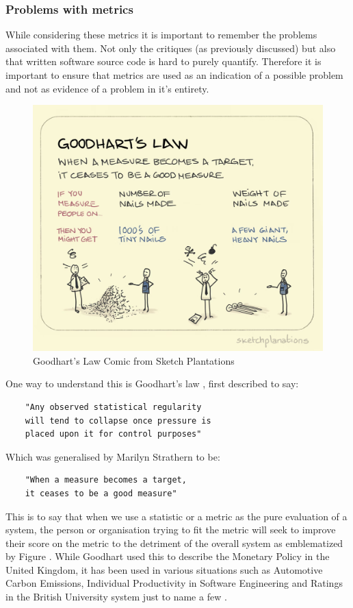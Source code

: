 \subsubsection{\textbf{Problems with metrics}}
While considering these metrics it is important to remember the problems associated with them. Not only the critiques (as previously discussed) 
but also that written software source code is hard to purely quantify. 
Therefore it is important to ensure that metrics are used as an indication of a possible problem and not as evidence of a 
problem in it's entirety.
\newline
\begin{figure}[h]
    \includegraphics[width=.4\textwidth]{images/goodhart.png}
    \caption{Goodhart's Law Comic from Sketch Plantations \cite{sketchplanations}}
    \label{fig:goodhart}
\end{figure}
One way to understand this is Goodhart's law \cite{Goodhart1984}, first described to say:
\begin{verbatim}
    "Any observed statistical regularity 
    will tend to collapse once pressure is 
    placed upon it for control purposes"
\end{verbatim}
\cite{Goodhart1984}
Which was generalised by Marilyn Strathern to be:
\begin{verbatim}
    "When a measure becomes a target, 
    it ceases to be a good measure"
\end{verbatim}
\cite{strathern1997improving}
This is to say that when we use a statistic or a metric as the pure evaluation of a system, the person or organisation trying to fit the metric will 
seek to improve their score on the metric to the detriment of the overall system as emblematized by Figure .
\newline
While Goodhart used this to describe the Monetary Policy in the United Kingdom, it has been used in various situations such as 
Automotive Carbon Emissions, Individual Productivity in Software Engineering and Ratings in the British University system 
just to name a few \cite{NBERw22911} \cite{FRITZ201667} \cite{strathern1997improving}.


